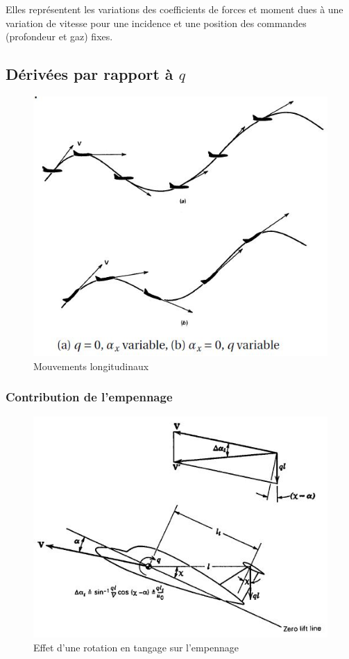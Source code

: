 \documentclass{report}
\begin{document}
Elles représentent les variations des coefficients de forces et moment dues à une variation de vitesse pour une incidence et une position des commandes (profondeur et gaz) fixes.

\subsection{Dérivées par rapport à $q$}

\begin{figure}[h!]
    \centering
    \includegraphics[scale=0.7]{37.JPG}
    \caption{Mouvements longitudinaux}
    \label{37}
\end{figure}

\subsubsection{Contribution de l'empennage}
\begin{figure}[h!]
    \centering
    \includegraphics[scale=0.7]{38.JPG}
    \caption{Effet d'une rotation en tangage sur l'empennage}
    \label{38}
\end{figure}
\end{document}
